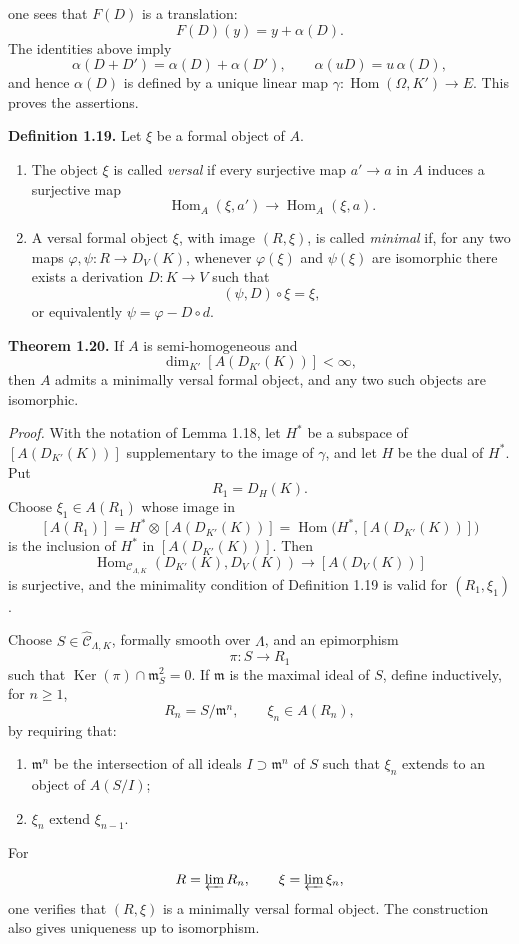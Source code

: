 \documentclass[11pt]{article}
\providecommand{\Ker}{\operatorname{Ker}}
\providecommand{\Hom}{\operatorname{Hom}}
\begin{document}
 one sees that \(F(D)\) is a translation:
\[
 F(D)(y)=y+\alpha(D).
\]
The identities above imply
\[
 \alpha(D+D')=\alpha(D)+\alpha(D'),\qquad
 \alpha(uD)=u\,\alpha(D),
\]
and hence \(\alpha(D)\) is defined by a unique linear map
\(\gamma:\Hom(\Omega,K')\to E\). This proves the assertions.

\textbf{Definition 1.19.} Let \(\xi\) be a formal object of \(A\).

\begin{enumerate}[label=(\arabic*)]
\item The object \(\xi\) is called \emph{versal} if every surjective map \(a'\to a\) in \(A\)
induces a surjective map
\[
 \Hom_A(\xi,a')\longrightarrow \Hom_A(\xi,a).
\]
\item A versal formal object \(\xi\), with image \((R,\xi)\), is called \emph{minimal} if,
for any two maps \(\varphi,\psi:R\to D_V(K)\), whenever \(\varphi(\xi)\) and
\(\psi(\xi)\) are isomorphic there exists a derivation \(D:K\to V\) such that
\[
 (\psi,D)\circ \xi=\xi,
\]
or equivalently \(\psi=\varphi-D\circ d\).
\end{enumerate}

\textbf{Theorem 1.20.} If \(A\) is semi-homogeneous and
\[
 \dim_{K'}[A(D_{K'}(K))]<\infty,
\]
then \(A\) admits a minimally versal formal object, and any two such objects are
isomorphic.

\emph{Proof.} With the notation of Lemma 1.18, let \(H^\ast\) be a subspace of
\([A(D_{K'}(K))]\) supplementary to the image of \(\gamma\), and let \(H\) be the dual
of \(H^\ast\). Put
\[
 R_1=D_H(K).
\]
Choose \(\xi_1\in A(R_1)\) whose image in
\[
 [A(R_1)]=H^\ast\otimes [A(D_{K'}(K))]
       =\Hom\bigl(H^\ast,[A(D_{K'}(K))]\bigr)
\]
is the inclusion of \(H^\ast\) in \([A(D_{K'}(K))]\). Then
\[
 \Hom_{\mathcal C_{\Lambda,K}}(D_{K'}(K),D_V(K))
   \longrightarrow [A(D_V(K))]
\]
is surjective, and the minimality condition of Definition 1.19 is valid for
\((R_1,\xi_1)\).

Choose \(S\in\widehat{\mathcal C}_{\Lambda,K}\), formally smooth over \(\Lambda\), and an
epimorphism
\[
 \pi:S\longrightarrow R_1
\]
such that \(\Ker(\pi)\cap\mathfrak m_S^2=0\). If \(\mathfrak m\) is the maximal ideal
of \(S\), define inductively, for \(n\geq 1\),
\[
 R_n=S/\mathfrak m^n,\qquad \xi_n\in A(R_n),
\]
by requiring that:
\begin{enumerate}[label=(\alph*)]
\item \(\mathfrak m^n\) be the intersection of all ideals \(I\supset\mathfrak m^n\) of \(S\)
such that \(\xi_n\) extends to an object of \(A(S/I)\);
\item \(\xi_n\) extend \(\xi_{n-1}\).
\end{enumerate}
For
\[
 R=\varprojlim R_n,\qquad \xi=\varprojlim \xi_n,
\]
one verifies that \((R,\xi)\) is a minimally versal formal object. The construction also gives
uniqueness up to isomorphism.
\end{document}
